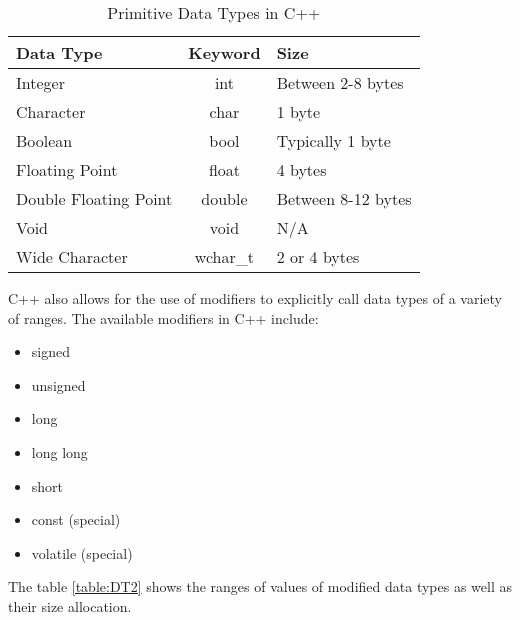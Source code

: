 \documentclass[12pt]{article}
\begin{document}
\begin{table}[h!]
  \begin{center}
    \caption{Primitive Data Types in C++}
    \label{table:DT1}
    \begin{tabular}{|l|c|l|}
      \toprule %
      \textbf{Data Type} & \textbf{Keyword} & \textbf{Size}\\
      \midrule %
      Integer & int & Between 2-8 bytes \\ 
      \hline
      Character & char & 1 byte \\
      \hline
      Boolean & bool & Typically 1 byte \\
      \hline
      Floating Point & float & 4 bytes \\
      \hline
      Double Floating Point & double & Between 8-12 bytes \\
      \hline
      Void & void & N/A \\
      \hline
      Wide Character & wchar\_t & 2 or 4 bytes\\ 
      \bottomrule
    \end{tabular}
  \end{center}
\end{table}

C++ also allows for the use of modifiers to explicitly call data types of a variety of ranges.
The available modifiers in C++ include:
\begin{itemize}
  \item signed
  \item unsigned
  \item long
  \item long long
  \item short
  \item const (special)
  \item volatile (special)
\end{itemize}

The table \ref{table:DT2} shows the ranges of values of modified data types as well as their size allocation.
\end{document}
